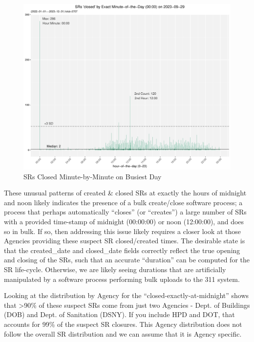 \documentclass[12pt, titlepage]{article}
\begin{document}
 	\begin{figure}[tbp]
		\centering
		\includegraphics[width=\textwidth]
		{2-year-trend-SR_closed_by_minute_of_busiest_day.pdf}
		\caption{SRs Closed Minute-by-Minute on Busiest Day}
		\label{fig:busiestclosed}
	\end{figure}	

	These unusual patterns of created \& closed SRs at exactly the hours 
	of midnight and noon likely indicates the presence of a bulk create/close 
	software process; a process that perhaps automatically ``closes'' 
	(or ``creates'') a large number of SRs with a provided time-stamp of 
	midnight (00:00:00) or noon (12:00:00), and does so in bulk. 
	If so, then addressing this issue likely requires a closer look at those 
	Agencies providing these suspect SR closed/created times. The desirable 
	state is that the created\_date and closed\_date fields correctly 
	reflect the true opening and closing of the SRs, such that an 
	accurate ``duration'' can be computed for the SR life-cycle. 
	Otherwise, we are likely seeing durations that are artificially 
	manipulated by a software process performing bulk uploads 
	to the 311 system.

	Looking at the distribution by Agency for the ``closed-exactly-at-midnight'' 
	shows that \textgreater90\% of these suspect SRs come from just two 
	Agencies - Dept. of Buildings (DOB) and Dept. of Sanitation (DSNY). 
	If you include HPD and DOT, that accounts for 99\% of the suspect 
	SR closures. This Agency distribution does not follow the overall 
	SR distribution and we can assume that it is Agency specific. 
\end{document}
